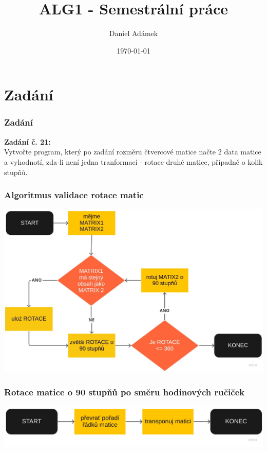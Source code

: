 \documentclass{beamer}
\title[Titulek]{ALG1 - Semestrální práce}
\author{Daniel Adámek}
\institute[Technická univerzita v Liverci]
{}
\date{\today} %
\begin{document}
\begin{frame}
\titlepage %
\end{frame}

\section{Zadání}
\begin{frame}
\frametitle{Zadání}
    \textbf{Zadání č. 21:} \\
    Vytvořte program, který po zadání rozměru čtvercové matice načte 2 data matice a vyhodnotí, zda-li není jedna
    tranformací - rotace druhé matice, případně o kolik stupňů.
\end{frame}
\begin{frame}
\frametitle{Algoritmus validace rotace matic}
    \includegraphics[scale=0.215]{alg1-flowchart}
\end{frame}
\begin{frame}
    \frametitle{Rotace matice o 90 stupňů \small{po směru hodinových ručiček}}
    \includegraphics[scale=0.12]{alg1-rotate-flowchart}
\end{frame}
\end{document}
